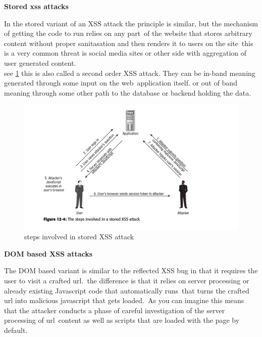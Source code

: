 \documentclass[a4paper,12pt]{paper}
\begin{document}
\textbf{Stored xss attacks}

In the stored variant of an XSS attack the principle is similar, but the mechanism of getting the code to run relies on any part\
of the website that stores arbitrary content without proper sanitasation and then renders it to users on the site\
this is a very common threat is social media sites or other side with aggregation of user generated content.\\
see \ref{fig:xsssto} this is also called a second order XSS attack. They can be in-band meaning generated through some input on the web\
application itself. or out of band meaning through some other path to the database or backend holding the data.\

\begin{figure}
\centering
\includegraphics[width=1\textwidth]{stored-XSS.png}
\caption{\label{fig:xsssto}steps involved in stored XSS attack}
\end{figure}

\textbf{DOM based XSS attacks}

The DOM based variant is similar to the reflected XSS bug in that it requires the user to visit a crafted url.\
the difference is that it relies on server processing or already existing Javascript code that automatically runs\
that turns the crafted url into malicious javascript that gets loaded.\
As you can imagine this means that the attacker conducts a phase of careful investigation of the server processing of url\
content as well as scripts that are loaded with the page by default.\\
\end{document}
